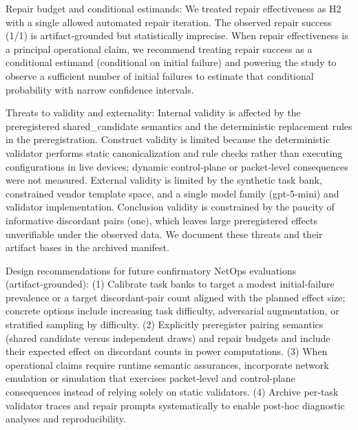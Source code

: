 \documentclass[conference]{IEEEtran}
\begin{document}
Repair budget and conditional estimands: We treated repair effectiveness as H2 with a single allowed automated repair iteration. The observed repair success (1/1) is artifact‑grounded but statistically imprecise. When repair effectiveness is a principal operational claim, we recommend treating repair success as a conditional estimand (conditional on initial failure) and powering the study to observe a sufficient number of initial failures to estimate that conditional probability with narrow confidence intervals.

Threats to validity and externality: Internal validity is affected by the preregistered shared\_candidate semantics and the deterministic replacement rules in the preregistration. Construct validity is limited because the deterministic validator performs static canonicalization and rule checks rather than executing configurations in live devices; dynamic control‑plane or packet‑level consequences were not measured. External validity is limited by the synthetic task bank, constrained vendor template space, and a single model family (gpt-5-mini) and validator implementation. Conclusion validity is constrained by the paucity of informative discordant pairs (one), which leaves large preregistered effects unverifiable under the observed data. We document these threats and their artifact bases in the archived manifest.

Design recommendations for future confirmatory NetOps evaluations (artifact‑grounded): (1) Calibrate task banks to target a modest initial‑failure prevalence or a target discordant‑pair count aligned with the planned effect size; concrete options include increasing task difficulty, adversarial augmentation, or stratified sampling by difficulty. (2) Explicitly preregister pairing semantics (shared candidate versus independent draws) and repair budgets and include their expected effect on discordant counts in power computations. (3) When operational claims require runtime semantic assurances, incorporate network emulation or simulation that exercises packet‑level and control‑plane consequences instead of relying solely on static validators. (4) Archive per‑task validator traces and repair prompts systematically to enable post‑hoc diagnostic analyses and reproducibility.
\end{document}

